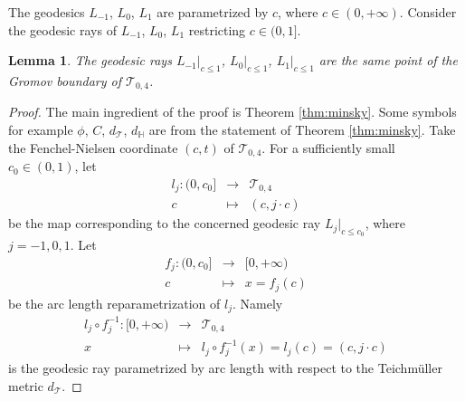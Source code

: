 \documentclass[UTF8]{amsart}
\newtheorem{lemma}[theorem]{Lemma}
\numberwithin{equation}{section}
\theoremstyle{definition}
\theoremstyle{example}
\theoremstyle{remark}
\begin{document}
The geodesics $L_{-1}$, $L_0$, $L_1$ are parametrized by $c$, where $c\in (0,+\infty)$. Consider the geodesic rays of $L_{-1}$, $L_0$, $L_1$ restricting $c\in (0,1]$. 
\begin{lemma}
 The geodesic rays $L_{-1}|_{c \le 1}$, $L_0|_{c \le 1}$, $L_1|_{c \le 1}$ are the same point of the Gromov boundary of $\mathcal{T}_{0,4}$. 
 \label{lem:limit}
\end{lemma}
\begin{proof}
 The main ingredient of the proof is Theorem \ref{thm:minsky}. Some symbols for example $\phi$, $C$, $d_{\mathcal{T}}$, $d_{\mathbb{H}}$ are from the statement of Theorem \ref{thm:minsky}. 
Take the Fenchel-Nielsen coordinate $(c,t)$ of $\mathcal{T}_{0,4}$.
 For a sufficiently small $c_0 \in (0,1)$,  let
 \begin{eqnarray*}
  l_j: (0,c_0] &\to& \mathcal{T}_{0,4} \\
  c &\mapsto& (c,j\cdot c)
 \end{eqnarray*}
 be the map corresponding to the concerned geodesic ray $L_j|_{c \le c_0}$, where $j= -1, 0, 1$. 
 Let 
 \begin{eqnarray*}
  f_j: (0,c_0] & \to & [0,+\infty) \\
  c& \mapsto & x = f_j(c) 
 \end{eqnarray*}
 be the arc length reparametrization of $l_j$. Namely
 \begin{eqnarray*}
  l_j\circ f_j^{-1}: [0,+\infty) & \to & \mathcal{T}_{0,4} \\
         x & \mapsto &  l_j\circ f_j^{-1}(x)= l_j(c) = (c, j\cdot c)
 \end{eqnarray*}
 is the geodesic ray parametrized by arc length with respect to the Teichm\"uller metric $d_{\mathcal{T}}$. 


\end{proof}
\end{document}

